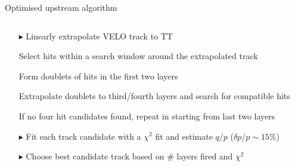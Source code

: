 \documentclass[aspectratio=1610]{beamer}
\begin{document}
\begin{frame}{Optimised upstream algorithm}
\begin{columns}
\begin{column}{0.5\textwidth}
\begin{itemize}
  \item[$\blacktriangleright$] Linearly extrapolate VELO track to TT
  \item[\ding{72}] Select hits within a search window around the extrapolated track
  \item[\ding{72}] Form doublets of hits in the first two layers
  \item[\ding{72}] Extrapolate doublets to third/fourth layers and search for compatible hits
  \item[\ding{72}] If no four hit candidates found, repeat in starting from last two layers
  \item[$\blacktriangleright$] Fit each track candidate with a $\chi^{2}$ fit and estimate $q/p$ ($\delta p/p \sim 15 \%$)
  \item[$\blacktriangleright$] Choose best candidate track based on \# layers fired and $\chi^{2}$
  \end{itemize}
\end{column}
\begin{column}{0.5\textwidth}
\centering

\end{column}
\end{columns}
\end{frame}
\end{document}
